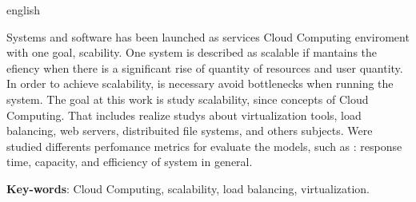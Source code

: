 \begin{resumo}[Abstract]
 \begin{otherlanguage*}{english}
 
Systems and software has been launched as services Cloud Computing enviroment with one goal, scability. One system is described as scalable if mantains the efiency when there is a significant rise of quantity of resources and user quantity. In order to achieve scalability, is necessary avoid bottlenecks when running the system. The goal at this work is study scalability, since concepts of Cloud Computing. That includes realize studys about virtualization tools, load balancing, web servers, distribuited file systems, and others subjects. Were studied differents perfomance metrics for evaluate the models, such as : response time, capacity, and efficiency of system in general.

   \vspace{\onelineskip}
 
   \noindent 
   \textbf{Key-words}: Cloud Computing, scalability, load balancing, virtualization.
 \end{otherlanguage*}
\end{resumo}